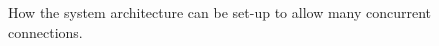 \documentclass[a4paper,12pt,titlepage]{article}
\begin{document}
\begin{itemize}
\begin{figure}[H]
		\caption{How the system architecture can be set-up to allow many concurrent connections.}
		\label{fig:scalability}
	\end{figure}
\end{itemize}
\end{document}
